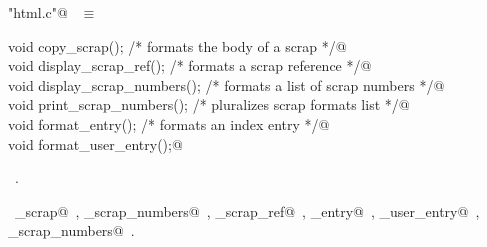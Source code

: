 \documentclass{report}
\begin{document}
\begin{flushleft} \small
\begin{minipage}{\linewidth} \label{scrap96}
\verb@"html.c"@\nobreak\ {\footnotesize {} }$\equiv$
\vspace{-1ex}
\begin{list}{}{} \item
\mbox{}\verb@static void copy_scrap();               /* formats the body of a scrap */@\\
\mbox{}\verb@static void display_scrap_ref();        /* formats a scrap reference */@\\
\mbox{}\verb@static void display_scrap_numbers();    /* formats a list of scrap numbers */@\\
\mbox{}\verb@static void print_scrap_numbers();      /* pluralizes scrap formats list */@\\
\mbox{}\verb@static void format_entry();             /* formats an index entry */@\\
\mbox{}\verb@static void format_user_entry();@\\
\mbox{}\verb@@{\NWsep}
\end{list}
\vspace{-1ex}
\footnotesize\addtolength{\baselineskip}{-1ex}
\begin{list}{}{\setlength{\itemsep}{-\parsep}\setlength{\itemindent}{-\leftmargin}}
\item \NWtxtFileDefBy\ .
\end{list}
\vspace{-2ex}
\footnotesize\addtolength{\baselineskip}{-1ex}
\begin{list}{}{\setlength{\itemsep}{-\parsep}\setlength{\itemindent}{-\leftmargin}}
\item \NWtxtIdentsUsed\nobreak\  \verb@copy_scrap@\nobreak\ , \verb@display_scrap_numbers@\nobreak\ , \verb@display_scrap_ref@\nobreak\ , \verb@format_entry@\nobreak\ , \verb@format_user_entry@\nobreak\ , \verb@print_scrap_numbers@\nobreak\ .\end{list}
\end{minipage}\\[4ex]
\end{flushleft}
\end{document}
